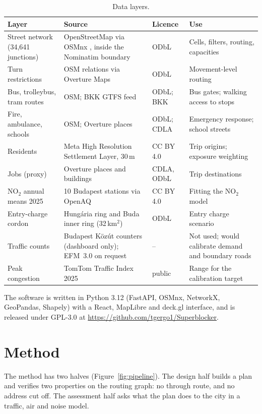 \documentclass[11pt,a4paper]{article}
\begin{document}
\begin{table}[ht]
\centering\small
\caption{Data layers.}\label{tab:data}
\begin{tabularx}{\linewidth}{@{}>{\raggedright}p{3.2cm}>{\raggedright}X>{\raggedright}p{1.5cm}>{\raggedright\arraybackslash}X@{}}
\toprule
Layer & Source & Licence & Use \\
\midrule
Street network (34,641 junctions) & OpenStreetMap via OSMnx \citep{boeing2017}, inside the Nominatim boundary & ODbL & Cells, filters, routing, capacities \\
Turn restrictions & OSM relations via Overture Maps & ODbL & Movement-level routing \\
Bus, trolleybus, tram routes & OSM; BKK GTFS feed & ODbL; BKK & Bus gates; walking access to stops \\
Fire, ambulance, schools & OSM; Overture places & ODbL; CDLA & Emergency response; school streets \\
Residents & Meta High Resolution Settlement Layer, 30\,m & CC BY 4.0 & Trip origins; exposure weighting \\
Jobs (proxy) & Overture places and buildings & CDLA, ODbL & Trip destinations \\
NO$_2$ annual means 2025 & 10 Budapest stations via OpenAQ & CC BY 4.0 & Fitting the NO$_2$ model \\
Entry-charge cordon & Hungária ring and Buda inner ring (32\,km$^2$) & ODbL & Entry charge scenario \\
Traffic counts & Budapest Közút counters (dashboard only); EFM~3.0 on request & -- & Not used; would calibrate demand and boundary roads \\
Peak congestion & TomTom Traffic Index 2025 \citep{tomtom2025} & public & Range for the calibration target \\
\bottomrule
\end{tabularx}
\end{table}

The software is written in Python 3.12 (FastAPI, OSMnx, NetworkX, GeoPandas, Shapely) with a React, MapLibre and deck.gl interface, and is released under GPL-3.0 at \url{https://github.com/tgergo1/Superblocker}.

\section{Method}\label{sec:method}

The method has two halves (Figure~\ref{fig:pipeline}). The design half builds a plan and verifies two properties on the routing graph: no through route, and no address cut off. The assessment half asks what the plan does to the city in a traffic, air and noise model.
\end{document}
